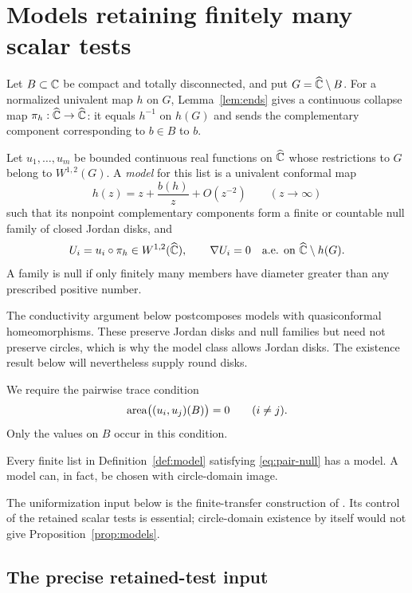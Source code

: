 \section{Models retaining finitely many scalar tests}\label{sec:models}

Let $B\subset\mathbb C$ be compact and totally disconnected, and put
$G=\widehat{\mathbb C}\setminus B$.  For a normalized univalent map $h$ on $G$,
Lemma~\ref{lem:ends} gives a continuous collapse map
$\pi_h:\widehat{\mathbb C}\to\widehat{\mathbb C}$: it equals $h^{-1}$ on $h(G)$ and sends the
complementary component corresponding to $b\in B$ to $b$.

\begin{definition}\label{def:model}
Let $u_1,\ldots,u_m$ be bounded continuous real functions on $\widehat{\mathbb C}$
whose restrictions to $G$ belong to $W^{1,2}(G)$.  A \emph{model} for
this list is a univalent conformal map
\[
 h(z)=z+\frac{b(h)}z+O(z^{-2})\qquad(z\to\infty)
\]
such that its nonpoint complementary components form a finite or
countable null family of closed Jordan disks, and
\[
 U_i=u_i\circ\pi_h\in W^{1,2}(\widehat{\mathbb C}),\qquad
 \nabla U_i=0\quad\text{a.e. on }\widehat{\mathbb C}\setminus h(G).
\]
A family is null if only finitely many members have diameter greater
than any prescribed positive number.
\end{definition}

The conductivity argument below postcomposes models with quasiconformal
homeomorphisms.  These preserve Jordan disks and null families but need
not preserve circles, which is why the model class allows Jordan disks.
The existence result below will nevertheless supply round disks.

We require the pairwise trace condition
\begin{equation}\label{eq:pair-null}
 \operatorname{area}\bigl((u_i,u_j)(B)\bigr)=0\qquad(i\ne j).
\end{equation}
Only the values on $B$ occur in this condition.

\begin{proposition}\label{prop:models}
Every finite list in Definition~\ref{def:model} satisfying
\eqref{eq:pair-null} has a model.  A model can, in fact, be chosen with
circle-domain image.
\end{proposition}

The uniformization input below is the finite-transfer construction of
\cite{KoebeCompanion}.  Its control of the retained scalar tests is
essential; circle-domain existence by itself would not give
Proposition~\ref{prop:models}.

\subsection{The precise retained-test input}

